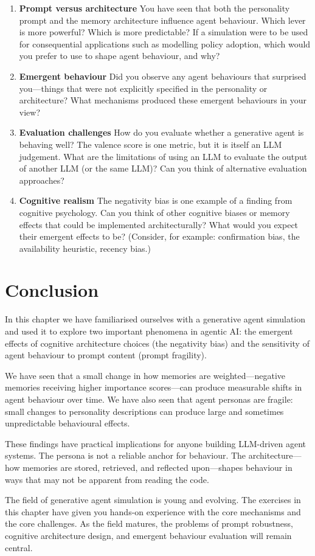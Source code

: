 \begin{enumerate}

\item \textbf{Prompt versus architecture} You have seen that both the personality prompt and the memory architecture influence agent behaviour. Which lever is more powerful? Which is more predictable? If a simulation were to be used for consequential applications such as modelling policy adoption, which would you prefer to use to shape agent behaviour, and why?

\item \textbf{Emergent behaviour} Did you observe any agent behaviours that surprised you---things that were not explicitly specified in the personality or architecture? What mechanisms produced these emergent behaviours in your view?

\item \textbf{Evaluation challenges} How do you evaluate whether a generative agent is behaving well? The valence score is one metric, but it is itself an LLM judgement. What are the limitations of using an LLM to evaluate the output of another LLM (or the same LLM)? Can you think of alternative evaluation approaches?

\item \textbf{Cognitive realism} The negativity bias is one example of a finding from cognitive psychology. Can you think of other cognitive biases or memory effects that could be implemented architecturally? What would you expect their emergent effects to be? (Consider, for example: confirmation bias, the availability heuristic, recency bias.)

\end{enumerate}

\section{Conclusion}

In this chapter we have familiarised ourselves with a generative agent simulation and used it to explore two important phenomena in agentic AI: the emergent effects of cognitive architecture choices (the negativity bias) and the sensitivity of agent behaviour to prompt content (prompt fragility).

We have seen that a small change in how memories are weighted---negative memories receiving higher importance scores---can produce measurable shifts in agent behaviour over time. We have also seen that agent personas are fragile: small changes to personality descriptions can produce large and sometimes unpredictable behavioural effects.

These findings have practical implications for anyone building LLM-driven agent systems. The persona is not a reliable anchor for behaviour. The architecture---how memories are stored, retrieved, and reflected upon---shapes behaviour in ways that may not be apparent from reading the code.

The field of generative agent simulation is young and evolving. The exercises in this chapter have given you hands-on experience with the core mechanisms and the core challenges. As the field matures, the problems of prompt robustness, cognitive architecture design, and emergent behaviour evaluation will remain central.
